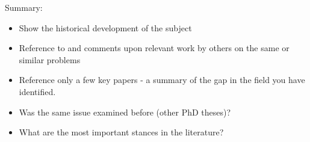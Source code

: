 Summary: 

\begin{itemize}
  \item Show the historical development of the subject
  \item Reference to and comments upon relevant work by others on the same or similar problems
  \item Reference only a few key papers - a summary of the gap in the field you have identified.
  \item Was the same issue examined before (other PhD theses)?
  \item What are the most important stances in the literature?
\end{itemize}
